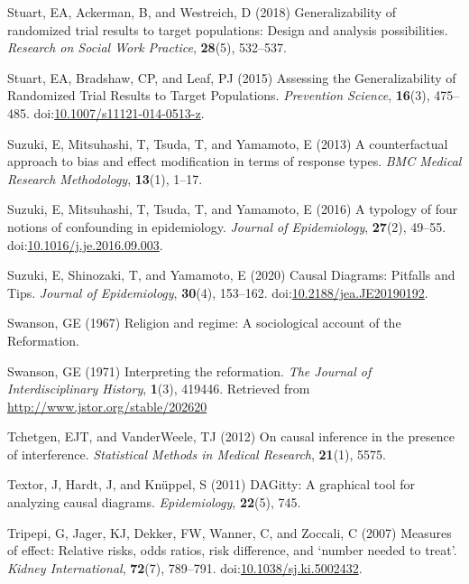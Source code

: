 \documentclass[
  singlecolumn]{article}
\newlength{\cslhangindent}
\newenvironment{CSLReferences}[2] %
 {\begin{list}{}{%
  \setlength{\itemindent}{0pt}
  \setlength{\leftmargin}{0pt}
  \setlength{\parsep}{0pt}
  \ifodd #1
   \setlength{\leftmargin}{\cslhangindent}
   \setlength{\itemindent}{-1\cslhangindent}
  \fi
  \setlength{\itemsep}{#2\baselineskip}}}
 {\end{list}}
\begin{document}
\begin{CSLReferences}{1}{0}
Stuart, EA, Ackerman, B, and Westreich, D (2018) Generalizability of
randomized trial results to target populations: Design and analysis
possibilities. \emph{Research on Social Work Practice}, \textbf{28}(5),
532--537.

Stuart, EA, Bradshaw, CP, and Leaf, PJ (2015) Assessing the
Generalizability of Randomized Trial Results to Target Populations.
\emph{Prevention Science}, \textbf{16}(3), 475--485.
doi:\href{https://doi.org/10.1007/s11121-014-0513-z}{10.1007/s11121-014-0513-z}.

Suzuki, E, Mitsuhashi, T, Tsuda, T, and Yamamoto, E (2013) A
counterfactual approach to bias and effect modification in terms of
response types. \emph{BMC Medical Research Methodology}, \textbf{13}(1),
1--17.

Suzuki, E, Mitsuhashi, T, Tsuda, T, and Yamamoto, E (2016) A typology of
four notions of confounding in epidemiology. \emph{Journal of
Epidemiology}, \textbf{27}(2), 49--55.
doi:\href{https://doi.org/10.1016/j.je.2016.09.003}{10.1016/j.je.2016.09.003}.

Suzuki, E, Shinozaki, T, and Yamamoto, E (2020) Causal Diagrams:
Pitfalls and Tips. \emph{Journal of Epidemiology}, \textbf{30}(4),
153--162.
doi:\href{https://doi.org/10.2188/jea.JE20190192}{10.2188/jea.JE20190192}.

Swanson, GE (1967) Religion and regime: A sociological account of the
{R}eformation.

Swanson, GE (1971) Interpreting the reformation. \emph{The Journal of
Interdisciplinary History}, \textbf{1}(3), 419446. Retrieved from
\url{http://www.jstor.org/stable/202620}

Tchetgen, EJT, and VanderWeele, TJ (2012) On causal inference in the
presence of interference. \emph{Statistical Methods in Medical
Research}, \textbf{21}(1), 5575.

Textor, J, Hardt, J, and Knüppel, S (2011) DAGitty: A graphical tool for
analyzing causal diagrams. \emph{Epidemiology}, \textbf{22}(5), 745.

Tripepi, G, Jager, KJ, Dekker, FW, Wanner, C, and Zoccali, C (2007)
Measures of effect: Relative risks, odds ratios, risk difference, and
{`}number needed to treat{'}. \emph{Kidney International},
\textbf{72}(7), 789--791.
doi:\href{https://doi.org/10.1038/sj.ki.5002432}{10.1038/sj.ki.5002432}.


\end{CSLReferences}
\end{document}
